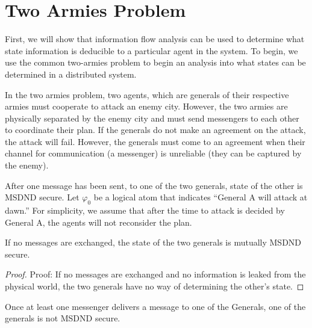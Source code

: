 \section{Two Armies Problem}

First, we will show that information flow analysis can be used to determine what state information is deducible to a particular agent in the system. To begin, we use the common two-armies problem to begin an analysis into what states can be determined in a distributed system.

In the two armies problem, two agents, which are generals of their respective armies must cooperate to attack an enemy city. However, the two armies are physically separated by the enemy city and must send messengers to each other to coordinate their plan. If the generals do not make an agreement on the attack, the attack will fail. However, the generals must come to an agreement when their channel for communication (a messenger) is unreliable (they can be captured by the enemy).

After one message has been sent, to one of the two generals, state of the other is MSDND secure. Let $\varphi_0$ be a logical atom that indicates ``General A will attack at dawn.'' For simplicity, we assume that after the time to attack is decided by General A, the agents will not reconsider the plan.

\begin{thm}
If no messages are exchanged, the state of the two generals is mutually MSDND secure. \label{thm:nomsg}
\end{thm}

\begin{proof}
Proof: If no messages are exchanged and no information is leaked from the physical world, the two generals have no way of determining the other's state.
\end{proof}

\begin{thm}
Once at least one messenger delivers a message to one of the Generals, one of the generals is not MSDND secure.
\end{thm}


